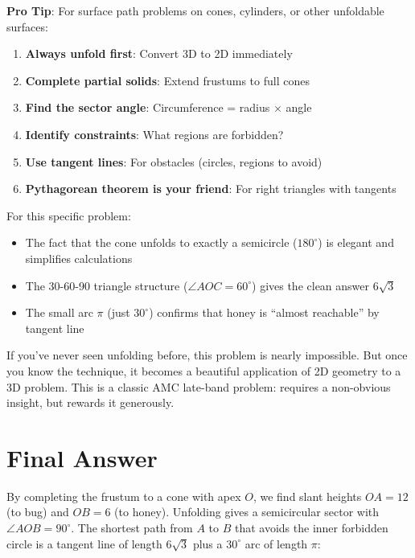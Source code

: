 \documentclass[12pt]{article}
\begin{document}
\begin{tipbox}
\textbf{Pro Tip}: For surface path problems on cones, cylinders, or other unfoldable surfaces:

\begin{enumerate}
    \item \textbf{Always unfold first}: Convert 3D to 2D immediately
    \item \textbf{Complete partial solids}: Extend frustums to full cones
    \item \textbf{Find the sector angle}: Circumference = radius $\times$ angle
    \item \textbf{Identify constraints}: What regions are forbidden?
    \item \textbf{Use tangent lines}: For obstacles (circles, regions to avoid)
    \item \textbf{Pythagorean theorem is your friend}: For right triangles with tangents
\end{enumerate}

For this specific problem:
\begin{itemize}
    \item The fact that the cone unfolds to exactly a semicircle ($180^\circ$) is elegant and simplifies calculations
    \item The 30-60-90 triangle structure ($\angle AOC = 60^\circ$) gives the clean answer $6\sqrt{3}$
    \item The small arc $\pi$ (just $30^\circ$) confirms that honey is ``almost reachable'' by tangent line
\end{itemize}

If you've never seen unfolding before, this problem is nearly impossible. But once you know the technique, it becomes a beautiful application of 2D geometry to a 3D problem. This is a classic AMC late-band problem: requires a non-obvious insight, but rewards it generously.
\end{tipbox}

\section*{Final Answer}

By completing the frustum to a cone with apex $O$, we find slant heights $OA = 12$ (to bug) and $OB = 6$ (to honey). Unfolding gives a semicircular sector with $\angle AOB = 90^\circ$. The shortest path from $A$ to $B$ that avoids the inner forbidden circle is a tangent line of length $6\sqrt{3}$ plus a $30^\circ$ arc of length $\pi$:
\end{document}
